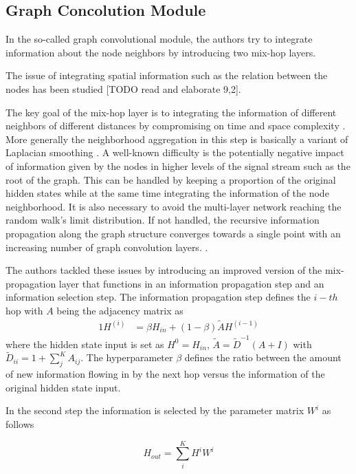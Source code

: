 \documentclass[letterpaper,twocolumn,11pt]{article}
\begin{document}
    \subsection{Graph Concolution Module}
    In the so-called graph convolutional module, the authors try to integrate information about the node neighbors by introducing two mix-hop layers.

    The issue of integrating spatial information such as the relation between the nodes has been studied [TODO read and elaborate 9,2].

    The key goal of the mix-hop layer is to integrating the information of different neighbors of different distances by compromising on time and space complexity \cite{AbuElHaija}.
    More generally the neighborhood aggregation in this step is basically a variant of Laplacian smoothing \cite{leskovec2005graphs}.
    A well-known difficulty is the potentially negative impact of information given by the nodes in higher levels of the signal stream such as the root of the graph.
    This can be handled by keeping a proportion of the original hidden states while at the same time integrating the information
    of the node neighborhood.
    It is also necessary to avoid the multi-layer network reaching the random walk's limit distribution.
    If not handled, the recursive information propagation along the graph structure converges towards a single point with an increasing number of graph convolution layers. \cite{klicpera2018predict}.

    The authors tackled these issues by introducing an improved version of the mix-propagation layer that functions in an
    information propagation step and an information selection step.
    The information propagation step defines the $i-th$ hop with $A$ being the adjacency matrix as
    \begin{alignat}{1}
        H^{(i)} &= \beta H_{in} + (1-\beta) \tilde{A} H^{(i-1)} \label{eq:hop}
    \end{alignat}
    where the hidden state input is set as $H^0 = H_{in}$, $\tilde{A} = \tilde{D}^{-1}(A +I)$ with $\tilde{D}_{ii}=1 + \sum_{j}^{K}A_{ij}$.
    The hyperparameter $\beta$ defines the ratio between the amount of new information flowing in by the next hop versus the information of the original hidden state input.

    In the second step the information is selected by the parameter matrix $W^{i}$ as follows

    \begin{equation}
        H_{out} =\sum_{i}^{K} H^i W^i  \label{eq:hop_selection}
    \end{equation}
\end{document}
